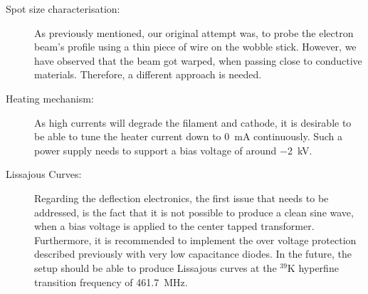 \begin{description}
	\item[Spot size characterisation:] As previously mentioned, our original attempt was, to probe the electron beam's profile using a thin piece of wire on the wobble stick. However, we have observed that the beam got warped, when passing close to conductive materials. Therefore, a different approach is needed. 
	\item[Heating mechanism:] As high currents will degrade the filament and cathode, it is desirable to be able to tune the heater current down to \SI{0}{\milli\ampere} continuously. Such a power supply needs to support a bias voltage of around \SI{-2}{\kilo\volt}. 
	\item[Lissajous Curves:] Regarding the deflection electronics, the first issue that needs to be addressed, is the fact that it is not possible to produce a clean sine wave, when a bias voltage is applied to the center tapped transformer. Furthermore, it is recommended to implement the over voltage protection described previously with very low capacitance diodes.  
	In the future, the setup should be able to produce Lissajous curves at the  $^{39}\mathrm{K}$ hyperfine transition frequency of \SI{461.7}{\mega\hertz}. 
\end{description}